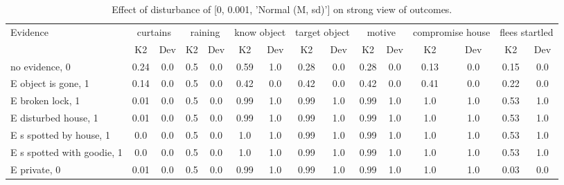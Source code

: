 \begin{table}\begin{tabular}{l|cc|cc|cc|cc|cc|cc|cc}\toprule\multirow{2}{*}{Evidence} & \multicolumn{2}{c}{curtains}& \multicolumn{2}{c}{raining}& \multicolumn{2}{c}{know object}& \multicolumn{2}{c}{target object}& \multicolumn{2}{c}{motive}& \multicolumn{2}{c}{compromise house}& \multicolumn{2}{c}{flees startled}\\& {K2} & {Dev}& {K2} & {Dev}& {K2} & {Dev}& {K2} & {Dev}& {K2} & {Dev}& {K2} & {Dev}& {K2} & {Dev}\\\midrule
no evidence, 0 & \cellcolor{Bittersweet}0.24&\cellcolor{Bittersweet}0.0&0.5&0.0&0.59&1.0&\cellcolor{Bittersweet}0.28&\cellcolor{Bittersweet}0.0&\cellcolor{Bittersweet}0.28&\cellcolor{Bittersweet}0.0&\cellcolor{Bittersweet}0.13&\cellcolor{Bittersweet}0.0&\cellcolor{Bittersweet}0.15&\cellcolor{Bittersweet}0.0\\E object is gone, 1 & \cellcolor{Bittersweet}0.14&\cellcolor{Bittersweet}0.0&0.5&0.0&0.42&0.0&0.42&0.0&0.42&0.0&0.41&0.0&\cellcolor{Bittersweet}0.22&\cellcolor{Bittersweet}0.0\\E broken lock, 1 & \cellcolor{Bittersweet}0.01&\cellcolor{Bittersweet}0.0&0.5&0.0&\cellcolor{Bittersweet}0.99&\cellcolor{Bittersweet}1.0&\cellcolor{Bittersweet}0.99&\cellcolor{Bittersweet}1.0&\cellcolor{Bittersweet}0.99&\cellcolor{Bittersweet}1.0&\cellcolor{Bittersweet}1.0&\cellcolor{Bittersweet}1.0&0.53&1.0\\E disturbed house, 1 & \cellcolor{Bittersweet}0.01&\cellcolor{Bittersweet}0.0&0.5&0.0&\cellcolor{Bittersweet}0.99&\cellcolor{Bittersweet}1.0&\cellcolor{Bittersweet}0.99&\cellcolor{Bittersweet}1.0&\cellcolor{Bittersweet}0.99&\cellcolor{Bittersweet}1.0&\cellcolor{Bittersweet}1.0&\cellcolor{Bittersweet}1.0&0.53&1.0\\E s spotted by house, 1 & \cellcolor{Bittersweet}0.0&\cellcolor{Bittersweet}0.0&0.5&0.0&\cellcolor{Bittersweet}1.0&\cellcolor{Bittersweet}1.0&\cellcolor{Bittersweet}0.99&\cellcolor{Bittersweet}1.0&\cellcolor{Bittersweet}0.99&\cellcolor{Bittersweet}1.0&\cellcolor{Bittersweet}1.0&\cellcolor{Bittersweet}1.0&0.53&1.0\\E s spotted with goodie, 1 & \cellcolor{Bittersweet}0.0&\cellcolor{Bittersweet}0.0&0.5&0.0&\cellcolor{Bittersweet}1.0&\cellcolor{Bittersweet}1.0&\cellcolor{Bittersweet}0.99&\cellcolor{Bittersweet}1.0&\cellcolor{Bittersweet}0.99&\cellcolor{Bittersweet}1.0&\cellcolor{Bittersweet}1.0&\cellcolor{Bittersweet}1.0&0.53&1.0\\E private, 0 & \cellcolor{Bittersweet}0.01&\cellcolor{Bittersweet}0.0&0.5&0.0&\cellcolor{Bittersweet}0.99&\cellcolor{Bittersweet}1.0&\cellcolor{Bittersweet}0.99&\cellcolor{Bittersweet}1.0&\cellcolor{Bittersweet}0.99&\cellcolor{Bittersweet}1.0&\cellcolor{Bittersweet}1.0&\cellcolor{Bittersweet}1.0&\cellcolor{Bittersweet}0.03&\cellcolor{Bittersweet}0.0\\\bottomrule\end{tabular}\caption{Effect of disturbance of [0, 0.001, 'Normal (M, sd)'] on strong view of outcomes.}\end{table}